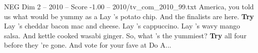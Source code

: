 \begin{textsample}{NEG Dim 2 – 2010 – Score -1.00 – 2010/tv\_com\_2010\_99.txt}  \label{ex:f2_neg_057}
America, you told us what would be yummy as a Lay 's potato chip.
And the finalists are here. \textbf{Try} Lay 's cheddar bacon mac and cheese.
Lay 's cappuccino.
Lay 's wavy mango salsa.
And kettle cooked wasabi ginger.
So, what 's the yummiest? \textbf{Try} all four before they 're gone.
And vote for your fave at Do A...

\end{textsample}
